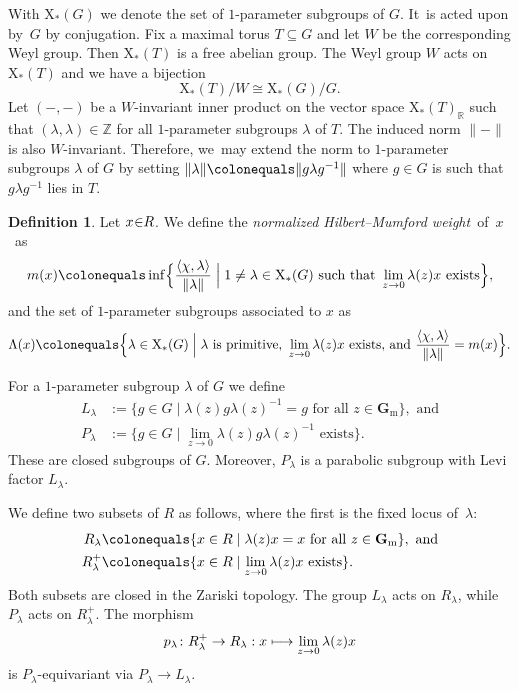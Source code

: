 \documentclass[11pt]{article}
\newcommand\mto{\mathchoice{\longmapsto}{\mapsto}{\mapsto}{\mapsto}}
\theoremstyle{plain}
\theoremstyle{definition}
\newtheorem{definition}[theorem]{Definition}
\newcommand\cocharacters{\ensuremath{\mathrm{X}_*}}
\newcommand\Gm{\ensuremath{\mathbf{G}_{\mathrm{m}}}}
\begin{document}
With $\cocharacters(G)$ we denote the set of $1$-parameter subgroups of $G$. It~is acted upon by~$G$ by conjugation.
Fix a maximal torus $T \subseteq G$ and let $W$ be the corresponding Weyl group.
Then $\cocharacters(T)$ is a free abelian group. The Weyl group $W$ acts on $\cocharacters(T)$ and we have a bijection
\begin{equation}\label{equation:cocharacters}
\cocharacters(T)/W \cong \cocharacters(G)/G.
\end{equation}
Let $(-,-)$ be a $W$-invariant inner product on the vector space $\cocharacters(T)_\mathbb{R}$
such that $(\lambda,\lambda) \in \mathbb{Z}$ for all $1$-parameter subgroups $\lambda$ of $T$.
The induced norm $\|{-}\|$ is also $W$\nobreakdash-invariant.
Therefore, we~may extend the norm to $1$-parameter subgroups $\lambda$ of $G$
by setting $\|\lambda\|\colonequals\|g\lambda g^{-1}\|$ where $g \in G$ is such that $g\lambda g^{-1}$ lies in $T$.

\begin{definition}
Let $x \mkern-4mu\in\mkern-5mu R$. We define the \emph{normalized Hilbert--Mumford weight}~of~$x$~as
\begin{equation*}
m(x)\colonequals \inf\Bigl\{ \frac{\langle\chi,\lambda\rangle}{\|\lambda\|}\Bigm| 1 \neq \lambda \in \cocharacters(G) \text{ such that } \lim_{z\to 0} \lambda(z)x \text{ exists}\Bigr\},
\end{equation*}
and the set of $1$-parameter subgroups associated to $x$ as
\begin{equation*}
\Lambda(x) \colonequals \Bigl\{ \lambda \in \cocharacters(G)\Bigm|\lambda \text{ is primitive, } \lim_{z\to 0} \lambda(z)x \text{ exists, and } \frac{\langle\chi,\lambda\rangle}{\|\lambda\|} = m(x) \Bigr\}.
\end{equation*}
\end{definition}

For a $1$-parameter subgroup $\lambda$ of $G$ we define
\begin{align}%
L_\lambda &:= \{ g \in G\mid \lambda(z)g\lambda(z)^{-1} = g \text{ for all } z \in \Gm \}, \text{ and}\\
P_\lambda &:= \{ g \in G\mid \lim_{z \to 0} \lambda(z)g\lambda(z)^{-1} \text{ exists}\}.
\end{align}
These are closed subgroups of $G$.
Moreover, $P_\lambda$ is a parabolic subgroup with Levi factor $L_\lambda$.

We define two subsets of $R$ as follows,
where the first is the fixed locus of~$\lambda$:
\begin{align*}
R_\lambda & \colonequals \{ x \in R \mid \lambda(z)x = x \text{ for all } z \in \Gm \}, \text{ and} \\
R_\lambda^+ & \colonequals \{ x \in R \mid \lim_{z \to 0}\lambda(z)x \text{ exists}\}.
\end{align*}
Both subsets are closed in the Zariski topology.
The group $L_\lambda$ acts on $R_\lambda$, while $P_\lambda$ acts on $R_\lambda^+$.
The morphism
\begin{equation}
\label{equation:p-lambda}
p_\lambda\colon R_\lambda^+ \to R_\lambda:x\mto\lim_{z \to 0}\lambda(z)x
\end{equation}
is $P_\lambda$-equivariant via $P_\lambda \to L_\lambda$.
\end{document}
